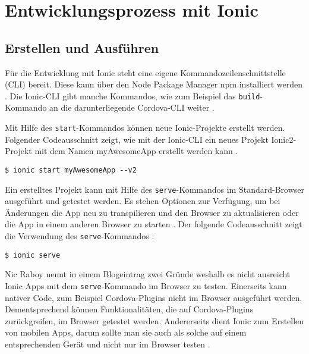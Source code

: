 \chapter{Entwicklungsprozess mit Ionic}
\label{Entwicklungsprozess}

\section{Erstellen und Ausführen}

Für die Entwicklung mit Ionic steht eine eigene Kommandozeilenschnittstelle (CLI) bereit. Diese kann über den Node Package Manager npm installiert werden \cite{ionic:cli}. Die Ionic-CLI gibt manche Kommandos, wie zum Beispiel das \texttt{build}-Kommando an die darunterliegende Cordova-CLI weiter \cite{ionic:build}.

Mit Hilfe des \texttt{start}-Kommandos können neue Ionic-Projekte erstellt werden. Folgender Codeausschnitt zeigt, wie mit der Ionic-CLI ein neues Projekt Ionic2-Projekt mit dem Namen myAwesomeApp erstellt werden kann \cite{ionic:cli}.
\begin{codebox}
\begin{lstlisting}[style=typescript]
$ ionic start myAwesomeApp --v2
\end{lstlisting}
\end{codebox}

Ein erstelltes Projekt kann mit Hilfe des \texttt{serve}-Kommandos im Standard-Browser ausgeführt und getestet werden. Es stehen Optionen zur Verfügung, um bei Änderungen die App neu zu transpilieren und den Browser zu aktualisieren oder die App in einem anderen Browser zu starten \cite{ionic:serve}. Der folgende Codeausschnitt zeigt die Verwendung des \texttt{serve}-Kommandos \cite{ionic:cli}:
\begin{codebox}
\begin{lstlisting}[style=typescript]
$ ionic serve
\end{lstlisting}
\end{codebox}

Nic Raboy nennt in einem Blogeintrag zwei Gründe weshalb es nicht ausreicht Ionic Apps mit dem \texttt{serve}-Kommando im Browser zu testen. Einerseits kann nativer Code, zum Beispiel Cordova-Plugins nicht im Browser ausgeführt werden. Dementsprechend können Funktionalitäten, die auf Cordova-Plugins zurückgreifen, im Browser getestet werden. Andererseits dient Ionic zum Erstellen von mobilen Apps, darum sollte man sie auch als solche auf einem entsprechenden Gerät und nicht nur im Browser testen \cite{raboy:serve}.

